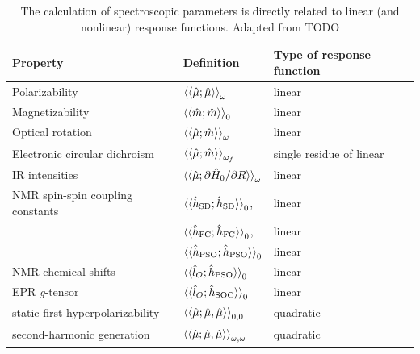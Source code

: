 \documentclass[%
class = book,%
crop = false,%
float = true,%
multi = true,%
preview = false,%
]{standalone}
\begin{document}
\begin{table}
  \centering
  \caption{The calculation of spectroscopic parameters is directly related to linear (and nonlinear) response functions. Adapted from TODO}
  \begin{tabular}{lll}
    \toprule
    \textbf{Property}                 & \textbf{Definition}                                                                    & \textbf{Type of response function} \\
    \midrule
    Polarizability                    & \( \braket{\braket{\hat{\mu};\hat{\mu}}}_{\omega} \)                                   & linear \\
    Magnetizability                   & \( \braket{\braket{\hat{m};\hat{m}}}_{0} \)                                            & linear \\
    Optical rotation                  & \( \braket{\braket{\hat{\mu};\hat{m}}}_{\omega} \)                                     & linear \\
    Electronic circular dichroism     & \( \braket{\braket{\hat{\mu};\hat{m}}}_{\omega_{f}} \)                                 & single residue of linear \\
    IR intensities                    & \( \braket{\braket{\hat{\mu};\partial\hat{H}_{0}/\partial R}}_{\omega} \)              & linear \\
    NMR spin-spin coupling constants  & \( \braket{\braket{\hat{h}_{\text{SD}};\hat{h}_{\text{SD}}}}_{0} \),                   & linear \\
                                      & \( \braket{\braket{\hat{h}_{\text{FC}};\hat{h}_{\text{FC}}}}_{0} \),                   & linear \\
                                      & \( \braket{\braket{\hat{h}_{\text{PSO}};\hat{h}_{\text{PSO}}}}_{0} \)                  & linear \\
    NMR chemical shifts               & \( \braket{\braket{\hat{l}_{O};\hat{h}_{\text{PSO}}}}_{0} \)                           & linear \\
    EPR \textit{g}-tensor             & \( \braket{\braket{\hat{l}_{O};\hat{h}_{\text{SOC}}}}_{0} \)                           & linear \\
    \midrule
    static first hyperpolarizability  & \( \braket{\braket{\hat{\mu};\hat{\mu},\hat{\mu}}}_{0,0} \)                            & quadratic \\
    second-harmonic generation        & \( \braket{\braket{\hat{\mu};\hat{\mu},\hat{\mu}}}_{\omega,\omega} \)                  & quadratic \\

\end{tabular}
\end{table}
\end{document}
